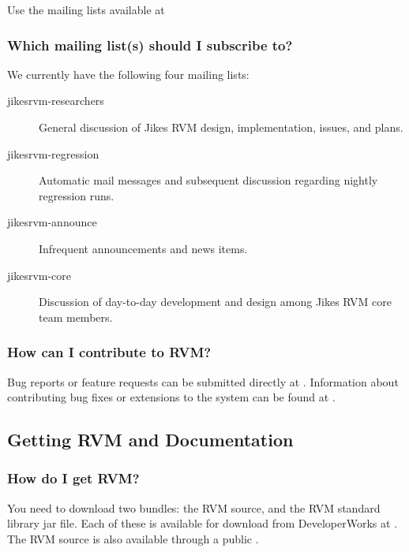Use the mailing lists available at 
\xlink{{\tt \RVMDownloadURL}}{\RVMDownloadURL}

\subsubsection{Which mailing list(s) should I subscribe to?}

We currently have the following four mailing lists:

\begin{description}
\item[jikesrvm-researchers]
    General discussion of Jikes RVM design, implementation, issues, and
    plans.
\item[jikesrvm-regression]
   Automatic mail messages and subsequent discussion regarding nightly
   regression runs.
\item[jikesrvm-announce]
  Infrequent announcements and news items.
\item[jikesrvm-core]
  Discussion of day-to-day development and design among Jikes RVM  core team
  members.
\end{description}


\subsubsection{How can I contribute to RVM?}
Bug reports or feature requests can be submitted directly at
\xlink{{\tt \RVMBugURL}}{\RVMBugURL}.  
Information about contributing bug fixes or extensions to the system
can be found at
\xlink{{\tt \RVMContribURL}}{\RVMContribURL}.   

\JavaTMFooter

\AIXPPCJikesTMFooter

\subsection{Getting RVM and Documentation}

\subsubsection{How do I get RVM?}

You need to download two bundles: the RVM source, and the RVM standard library
jar file.  Each of these is available for download from DeveloperWorks at
\xlink{{\tt \RVMDownloadURL}}{\RVMDownloadURL}.  
The RVM source is also available through a 
public 
.

